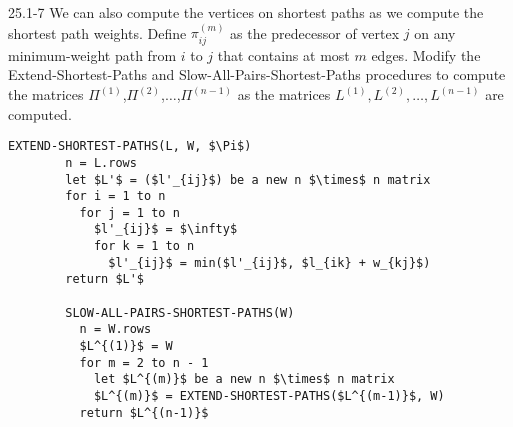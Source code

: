\begin{problem}{25.1-7}
  We can also compute the vertices on shortest paths as we compute the shortest path weights.  Define $\pi^{(m)}_{ij}$
  as the predecessor of vertex $j$ on any minimum-weight path from $i$ to $j$ that contains at most $m$ edges.  Modify
  the Extend-Shortest-Paths and Slow-All-Pairs-Shortest-Paths procedures to compute the matrices
  $\Pi^{(1)}$,$\Pi^{(2)}$,$\ldots$,$\Pi^{(n-1)}$ as the matrices $L^{(1)},L^{(2)},\ldots,L^{(n-1)}$ are computed.
  \begin{solution}
    \begin{lstlisting}[mathescape]
      EXTEND-SHORTEST-PATHS(L, W, $\Pi$)
        n = L.rows
        let $L'$ = ($l'_{ij}$) be a new n $\times$ n matrix
        for i = 1 to n
          for j = 1 to n
            $l'_{ij}$ = $\infty$
            for k = 1 to n
              $l'_{ij}$ = min($l'_{ij}$, $l_{ik} + w_{kj}$)
        return $L'$

        SLOW-ALL-PAIRS-SHORTEST-PATHS(W)
          n = W.rows
          $L^{(1)}$ = W
          for m = 2 to n - 1
            let $L^{(m)}$ be a new n $\times$ n matrix
            $L^{(m)}$ = EXTEND-SHORTEST-PATHS($L^{(m-1)}$, W)
          return $L^{(n-1)}$
    \end{lstlisting}
  \end{solution}
\end{problem}


